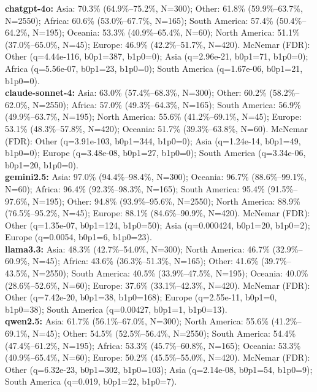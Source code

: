 \textbf{chatgpt-4o:} Asia: 70.3\% (64.9\%–75.2\%, N=300); Other: 61.8\% (59.9\%–63.7\%, N=2550); Africa: 60.6\% (53.0\%–67.7\%, N=165); South America: 57.4\% (50.4\%–64.2\%, N=195); Oceania: 53.3\% (40.9\%–65.4\%, N=60); North America: 51.1\% (37.0\%–65.0\%, N=45); Europe: 46.9\% (42.2\%–51.7\%, N=420). McNemar (FDR): Other (q=4.44e-116, b0p1=387, b1p0=0); Asia (q=2.96e-21, b0p1=71, b1p0=0); Africa (q=5.56e-07, b0p1=23, b1p0=0); South America (q=1.67e-06, b0p1=21, b1p0=0). \\ \textbf{claude-sonnet-4:} Asia: 63.0\% (57.4\%–68.3\%, N=300); Other: 60.2\% (58.2\%–62.0\%, N=2550); Africa: 57.0\% (49.3\%–64.3\%, N=165); South America: 56.9\% (49.9\%–63.7\%, N=195); North America: 55.6\% (41.2\%–69.1\%, N=45); Europe: 53.1\% (48.3\%–57.8\%, N=420); Oceania: 51.7\% (39.3\%–63.8\%, N=60). McNemar (FDR): Other (q=3.91e-103, b0p1=344, b1p0=0); Asia (q=1.24e-14, b0p1=49, b1p0=0); Europe (q=3.48e-08, b0p1=27, b1p0=0); South America (q=3.34e-06, b0p1=20, b1p0=0). \\ \textbf{gemini2.5:} Asia: 97.0\% (94.4\%–98.4\%, N=300); Oceania: 96.7\% (88.6\%–99.1\%, N=60); Africa: 96.4\% (92.3\%–98.3\%, N=165); South America: 95.4\% (91.5\%–97.6\%, N=195); Other: 94.8\% (93.9\%–95.6\%, N=2550); North America: 88.9\% (76.5\%–95.2\%, N=45); Europe: 88.1\% (84.6\%–90.9\%, N=420). McNemar (FDR): Other (q=1.35e-07, b0p1=124, b1p0=50); Asia (q=0.000424, b0p1=20, b1p0=2); Europe (q=0.0054, b0p1=6, b1p0=23). \\ \textbf{llama3.3:} Asia: 48.3\% (42.7\%–54.0\%, N=300); North America: 46.7\% (32.9\%–60.9\%, N=45); Africa: 43.6\% (36.3\%–51.3\%, N=165); Other: 41.6\% (39.7\%–43.5\%, N=2550); South America: 40.5\% (33.9\%–47.5\%, N=195); Oceania: 40.0\% (28.6\%–52.6\%, N=60); Europe: 37.6\% (33.1\%–42.3\%, N=420). McNemar (FDR): Other (q=7.42e-20, b0p1=38, b1p0=168); Europe (q=2.55e-11, b0p1=0, b1p0=38); South America (q=0.00427, b0p1=1, b1p0=13). \\ \textbf{qwen2.5:} Asia: 61.7\% (56.1\%–67.0\%, N=300); North America: 55.6\% (41.2\%–69.1\%, N=45); Other: 54.5\% (52.5\%–56.4\%, N=2550); South America: 54.4\% (47.4\%–61.2\%, N=195); Africa: 53.3\% (45.7\%–60.8\%, N=165); Oceania: 53.3\% (40.9\%–65.4\%, N=60); Europe: 50.2\% (45.5\%–55.0\%, N=420). McNemar (FDR): Other (q=6.32e-23, b0p1=302, b1p0=103); Asia (q=2.14e-08, b0p1=54, b1p0=9); South America (q=0.019, b0p1=22, b1p0=7). \\
